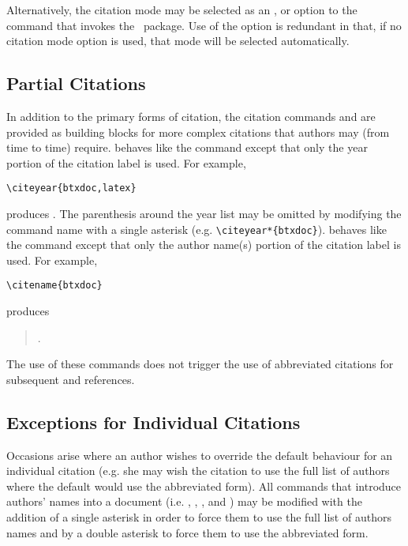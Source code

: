 Alternatively, the citation mode may be selected as an
,  or 
option to the
 command that invokes the \harvard\ package.
Use of the  option is redundant in that, if no citation
mode option is used, that mode will be selected automatically.

\subsection{Partial Citations}

In addition to the primary forms of citation, the citation commands
 and  are provided as building blocks
for more complex citations that authors may (from time to time) require.
 behaves like the
 command except that only the year portion of the
citation label is used.
For example,
\begin{verbatim}
\citeyear{btxdoc,latex}
\end{verbatim}
produces \citeyear{btxdoc,latex}.
The parenthesis around the year list may be omitted by modifying the command
name with a single asterisk (e.g. \verb+\citeyear*{btxdoc}+).
 behaves like the
 command except that only the author name(s)
portion of the citation label is used.
For example,
\begin{verbatim}
\citename{btxdoc}
\end{verbatim}
produces
\begin{quote}
.
\end{quote}
The use of these commands does not trigger the use of abbreviated citations for
subsequent  and 
references.

\subsection{Exceptions for Individual Citations}

Occasions arise where an author wishes to override the default behaviour for
an individual citation (e.g. she may wish the citation to use the full list
of authors where the default would use the abbreviated form).
All commands that introduce authors' names into a document (i.e.
, , ,
 and ) may be modified with the
addition of a single asterisk in order to force them to use the full
list of authors names and by a double asterisk to force them to use the
abbreviated form.

